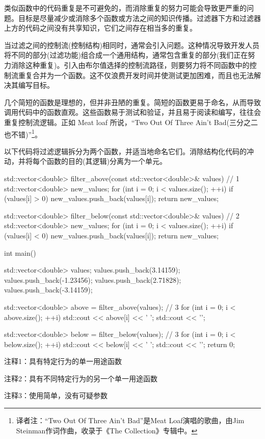 
类似函数中的代码重复是不可避免的，而消除重复的努力可能会导致更严重的问题。目标是尽量减少或消除多个函数或方法之间的知识传播。过滤器下方和过滤器上方的代码之间没有共享知识，它们之间存在相当多的重复。

当过滤之间的控制流(控制结构)相同时，通常会引入问题。这种情况导致开发人员将不同的部分(过滤功能)组合成一个通用结构，通常包含重复的部分(我们正在努力消除这种重复)。引入由布尔值选择的控制流路径，则要努力将不同函数中的控制流重复合并为一个函数。这不仅浪费开发时间并使测试更加困难，而且也无法解决其编写目标。

几个简短的函数是理想的，但并非丑陋的重复。简短的函数更易于命名，从而导致调用代码中的函数直观。这些函数易于测试和验证，并且易于阅读和编写，往往会重复控制流逻辑。正如 Meat loaf 所说，“Two Out Of Three Ain't Bad(三分之二也不错)”\footnote{译者注：“Two Out Of Three Ain't Bad”是Meat Loaf演唱的歌曲，由Jim Steinman作词作曲，收录于《The Collection》专辑中。}。

以下代码将过滤逻辑拆分为两个函数，并适当地命名它们。消除结构化代码的冲动，并将每个函数的目的(其逻辑)分离为一个单元。


\begin{cpp}
std::vector<double> filter_above(const
    std::vector<double>& values) { // 1
  std::vector<double> new_values;
  for (int i = 0; i < values.size(); ++i)
    if (values[i] > 0)
      new_values.push_back(values[i]);
  return new_values;
}

std::vector<double> filter_below(const
    std::vector<double>& values) { // 2
  std::vector<double> new_values;
  for (int i = 0; i < values.size(); ++i)
    if (values[i] < 0)
      new_values.push_back(values[i]);
  return new_values;
}

int main() {
  std::vector<double> values;
  values.push_back(3.14159);
  values.push_back(-1.23456);
  values.push_back(2.71828);
  values.push_back(-3.14159);

  std::vector<double> above = filter_above(values); // 3
  for (int i = 0; i < above.size(); ++i)
    std::cout << above[i] << ' ';
  std::cout << '\n';

  std::vector<double> below = filter_below(values); // 3
  for (int i = 0; i < below.size(); ++i)
    std::cout << below[i] << ' ';
  std::cout << '\n';
  return 0;
}
\end{cpp}

{\footnotesize
注释1：具有特定行为的单一用途函数

注释2：具有不同特定行为的另一个单一用途函数

注释3：使用简单，没有可疑参数
}

